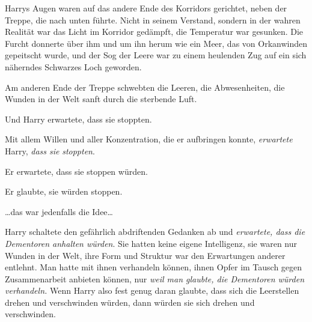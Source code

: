 Harrys Augen waren auf das andere Ende des Korridors gerichtet, neben der Treppe, die nach unten führte. Nicht in seinem Verstand, sondern in der wahren Realität war das Licht im Korridor gedämpft, die Temperatur war gesunken. Die Furcht donnerte über ihm und um ihn herum wie ein Meer, das von Orkanwinden gepeitscht wurde, und der Sog der Leere war zu einem heulenden Zug auf ein sich näherndes Schwarzes Loch geworden.

Am anderen Ende der Treppe schwebten die Leeren, die Abwesenheiten, die Wunden in der Welt sanft durch die sterbende Luft.

Und Harry erwartete, dass sie stoppten.

Mit allem Willen und aller Konzentration, die er aufbringen konnte, \emph{erwartete} Harry, \emph{dass sie} \emph{stoppten}.

Er erwartete, dass sie stoppen würden.

Er glaubte, sie würden stoppen.

…das war jedenfalls die Idee…

Harry schaltete den gefährlich abdriftenden Gedanken ab und \emph{erwartete, dass die Dementoren anhalten würden}. Sie hatten keine eigene Intelligenz, sie waren nur Wunden in der Welt, ihre Form und Struktur war den Erwartungen anderer entlehnt. Man hatte mit ihnen verhandeln können, ihnen Opfer im Tausch gegen Zusammenarbeit anbieten können, nur \emph{weil man glaubte, die Dementoren würden verhandeln.} Wenn Harry also fest genug daran glaubte, dass sich die Leerstellen drehen und verschwinden würden, dann würden sie sich drehen und verschwinden.

